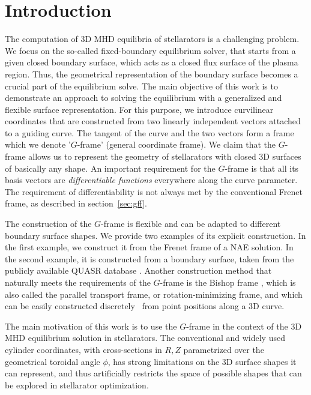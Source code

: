 \documentclass[12pt]{iopart}
\newcommand\hladdedrev[1]{#1} %
\newcommand\hlchangedrev[1]{#1} %
\newcommand\GFF{$G$-frame}
\begin{document}
\section{Introduction}
\label{sec:intro}
\hladdedrev{The computation of 3D MHD equilibria of stellarators is a challenging problem. We focus on the so-called fixed-boundary equilibrium solver, that starts from a given closed boundary surface, which acts as a closed flux surface of the plasma region. Thus, the geometrical representation of the boundary surface becomes a crucial part of the equilibrium solve. The main objective of this work is to demonstrate an approach to solving the equilibrium with a generalized and flexible surface representation.}
%
\hlchangedrev{For this purpose, we introduce curvilinear coordinates that are constructed from two linearly independent vectors attached to a guiding curve. The tangent of the curve and the two vectors form a frame which we denote '\GFF' (general coordinate frame).} 
We claim that the \GFF{} allows us to represent the geometry of stellarators with closed 3D surfaces of basically any shape. 
%
An important requirement for the \GFF{} is that all its basis vectors are \hlchangedrev{\emph{differentiable functions}} everywhere along the curve parameter. The requirement of differentiability is not always met by the conventional Frenet frame, as described in section~\ref{sec:gff}. 

\hladdedrev{The construction of the \GFF{} is flexible and can be adapted to different boundary surface shapes. We provide two examples of its explicit construction. In the first example, we construct it from the Frenet frame of a NAE solution. In the second example, it is constructed from a boundary surface, taken from the publicly available QUASR database \cite{Giuliani_2024_quasr}.}
Another construction method that naturally meets the requirements of the \GFF{} is the Bishop frame \cite{bishop_frame,yilmaz_new_bishop}, which is also called the parallel transport frame, or rotation-minimizing frame, and which can be easily \hlchangedrev{constructed discretely~\cite{rotation_minimizing_frame} from point positions along a 3D curve.}

The main motivation of this work is to use the \GFF{} in the context of the 3D MHD equilibrium solution in stellarators. The conventional and widely used cylinder coordinates, with cross-sections in $R,Z$ parametrized over the geometrical toroidal angle $\phi$, has strong limitations on the 3D surface shapes it can represent, and thus artificially restricts the space of possible shapes that can be explored in stellarator optimization.
\end{document}
